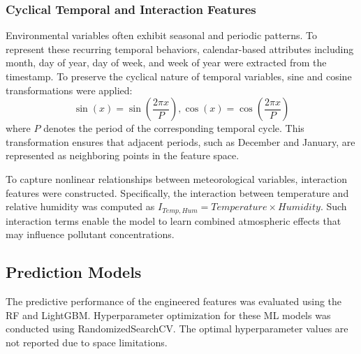 \documentclass[twoside]{article}
\begin{document}



\subsubsection{Cyclical Temporal and Interaction Features} 
Environmental variables often exhibit seasonal and periodic patterns. To represent these recurring temporal behaviors, calendar-based attributes including month, day of year, day of week, and week of year were extracted from the timestamp. To preserve the cyclical nature of temporal variables, sine and cosine transformations were applied:
\begin{equation*}
\sin(x)=\sin\left(\frac{2\pi x}{P}\right), \cos(x)=\cos\left(\frac{2\pi x}{P}\right)
\end{equation*}
where $P$ denotes the period of the corresponding temporal cycle. This transformation ensures that adjacent periods, such as December and January, are represented as neighboring points in the feature space.

To capture nonlinear relationships between meteorological variables, interaction features were constructed. Specifically, the interaction between temperature and relative humidity was computed as $I_{Temp,Hum}=Temperature \times Humidity$. 
Such interaction terms enable the model to learn combined atmospheric effects that may influence pollutant concentrations.
\subsection{Prediction Models}  
The predictive performance of the engineered features was evaluated using the RF and LightGBM. Hyperparameter optimization for these ML models was conducted using RandomizedSearchCV. The optimal hyperparameter values are not reported due to space limitations.

\end{document}
